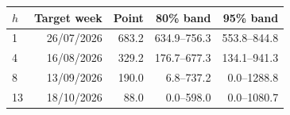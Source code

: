 \begin{tabular}{lrrrr}
\toprule
$h$ & Target week & Point & 80\% band & 95\% band \\
\midrule
1 & 26/07/2026 & 683.2 & 634.9--756.3 & 553.8--844.8 \\
4 & 16/08/2026 & 329.2 & 176.7--677.3 & 134.1--941.3 \\
8 & 13/09/2026 & 190.0 & 6.8--737.2 & 0.0--1288.8 \\
13 & 18/10/2026 & 88.0 & 0.0--598.0 & 0.0--1080.7 \\
\bottomrule
\end{tabular}
